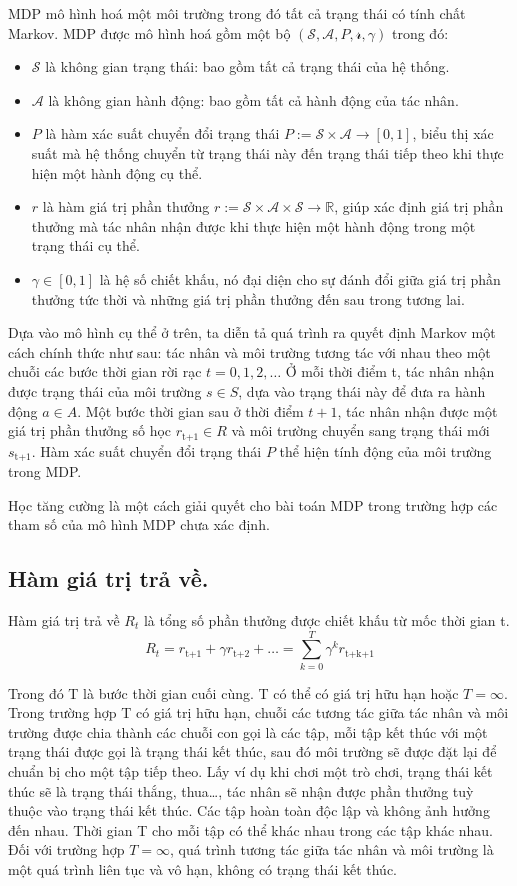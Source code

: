 \documentclass{uetgraduation}
\begin{document}
MDP mô hình hoá một môi trường trong đó tất cả trạng thái có tính chất Markov. MDP được mô hình hoá gồm một bộ $(\mathcal{S}, \mathcal{A}, P, \mathcal{r}, \gamma)$ trong đó:
\begin{itemize}
    \item $\mathcal{S}$ là không gian trạng thái: bao gồm tất cả trạng thái của hệ thống.
    \item $\mathcal{A}$ là không gian hành động: bao gồm tất cả hành động của tác nhân.
    \item $P$ là hàm xác suất chuyển đổi trạng thái $P := \mathcal{S} \times \mathcal{A} \to [0, 1] $, biểu thị xác suất mà hệ thống chuyển từ trạng thái này đến trạng thái tiếp theo khi thực hiện
    một hành động cụ thể.
    \item $r$ là hàm giá trị phần thưởng $r := \mathcal{S} \times \mathcal{A} \times \mathcal{S} \to \mathbb{R}$, giúp xác định giá trị phần thưởng mà tác nhân nhận được khi thực hiện một hành động
    trong một trạng thái cụ thể.
    \item $\gamma \in [0, 1]$ là hệ số chiết khấu, nó đại diện cho sự đánh đổi giữa giá trị phần thưởng tức thời và những giá trị phần thưởng đến sau trong tương lai.
\end{itemize}

Dựa vào mô hình cụ thể ở trên, ta diễn tả quá trình ra quyết định Markov một cách chính thức như sau: tác nhân và môi trường tương tác với nhau theo một chuỗi các bước thời gian rời rạc
$t = 0, 1, 2,\dots$ Ở mỗi thời điểm t, tác nhân nhận được trạng thái của môi trường $s \in S$, dựa vào trạng thái này để đưa ra hành động $a \in A$. Một bước thời gian sau ở thời điểm $t+1$,
tác nhân nhận được một giá trị phần thưởng số học $r_\text{t+1} \in R$ và môi trường chuyển sang trạng thái mới $s_\text{t+1}$. Hàm xác suất chuyển đổi trạng thái $P$ thể hiện tính động của
môi trường trong MDP.

Học tăng cường là một cách giải quyết cho bài toán MDP trong trường hợp các tham số của mô hình MDP chưa xác định.

\subsection{Hàm giá trị trả về.}
Hàm giá trị trả về $R_t$ là tổng số phần thưởng được chiết khấu từ mốc thời gian t.
\[
R_t = r_\text{t+1} + \gamma r_\text{t+2} + \dots = \sum_{k=0}^{T} \gamma^k r_\text{t+k+1}
\]

Trong đó T là bước thời gian cuối cùng. T có thể có giá trị hữu hạn hoặc $T = \infty$. Trong trường hợp T có giá trị hữu hạn, chuỗi các tương tác giữa tác nhân và môi trường được chia thành các chuỗi
con gọi là các tập, mỗi tập kết thúc với một trạng thái được gọi là trạng thái kết thúc, sau đó môi trường sẽ được đặt lại để chuẩn bị cho một tập tiếp theo. Lấy ví dụ khi chơi một trò chơi, trạng thái
kết thúc sẽ là trạng thái thắng, thua\dots, tác nhân sẽ nhận được phần thưởng tuỳ thuộc vào trạng thái kết thúc. Các tập hoàn toàn độc lập và không ảnh hưởng đến nhau. Thời gian T cho mỗi tập có thể khác
nhau trong các tập khác nhau. Đối với trường hợp $T = \infty$, quá trình tương tác giữa tác nhân và môi trường là một quá trình liên tục và vô hạn, không có trạng thái kết thúc.
\end{document}
